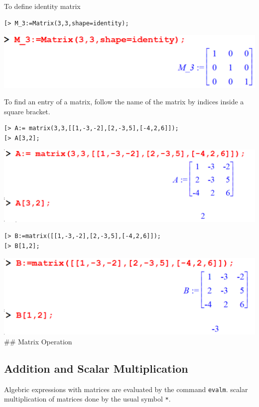\documentclass[
]{book}
\theoremstyle{definition}
\theoremstyle{definition}
\theoremstyle{definition}
\theoremstyle{definition}
\theoremstyle{remark}
\begin{document}
To define identity matrix

\begin{verbatim}
[> M_3:=Matrix(3,3,shape=identity);
\end{verbatim}

\includegraphics{figures/Lesson 4/fig21.png}

To find an entry of a matrix, follow the name of the matrix by indices inside a square bracket.

\begin{verbatim}
[> A:= matrix(3,3,[[1,-3,-2],[2,-3,5],[-4,2,6]]);
[> A[3,2];
\end{verbatim}

\includegraphics{figures/Lesson 4/fig22.png}

\begin{verbatim}
[> B:=matrix([[1,-3,-2],[2,-3,5],[-4,2,6]]);
[> B[1,2];
\end{verbatim}

\includegraphics{figures/Lesson 4/fig23.png}
\#\# Matrix Operation

\subsection{Addition and Scalar Multiplication}\label{addition-and-scalar-multiplication}

Algebric expressions with matrices are evaluated by the command \texttt{evalm}. scalar multiplication of matrices done by the usual symbol \texttt{*}.
\end{document}
